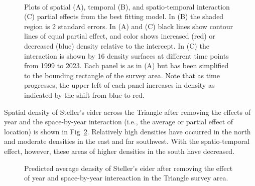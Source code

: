 \documentclass[
  10pt,
  letterpaper,
]{article}
\begin{document}
\begin{figure}

\begin{minipage}{0.45\linewidth}


\end{minipage}%
%
\begin{minipage}{0.10\linewidth}
~\end{minipage}%
%
\begin{minipage}{0.45\linewidth}


\end{minipage}%
\newline
\begin{minipage}{\linewidth}



\end{minipage}%

\caption{\label{fig-model}Plots of spatial (A), temporal (B), and
spatio-temporal interaction (C) partial effects from the best fitting
model. In (B) the shaded region is 2 standard errors. In (A) and (C)
black lines show contour lines of equal partial effect, and color shows
increased (red) or decreased (blue) density relative to the intercept.
In (C) the interaction is shown by 16 density surfaces at different time
points from 1999 to 2023. Each panel is as in (A) but has been
simplified to the bounding rectangle of the survey area. Note that as
time progresses, the upper left of each panel increases in density as
indicated by the shift from blue to red.}

\end{figure}%

Spatial density of Steller's eider across the Triangle after removing
the effects of year and the space-by-year interaction (i.e., the average
or partial effect of location) is shown in Fig~\ref{fig-densityABR}.
Relatively high densities have occurred in the north and moderate
densities in the east and far southwest. With the spatio-temporal
effect, however, these areas of higher densities in the south have
decreased.

\begin{figure}

\caption{\label{fig-densityABR}Predicted average density of Steller's
eider after removing the effect of year and space-by-year intereaction
in the Triangle survey area.}

\end{figure}%
\end{document}
